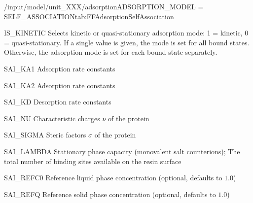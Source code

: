 \begin{condsubgroup}{/input/model/unit\_XXX/adsorption}{ADSORPTION\_MODEL = SELF\_ASSOCIATION}{tab:FFAdsorptionSelfAssociation}
\begin{dataset}[type=int,range={$\{ 0,1 \}$},length={1 / \texttt{NTOTALBND}}]{IS\_KINETIC}
    Selects kinetic or quasi-stationary adsorption mode: 1 = kinetic, 0 = quasi-stationary.
    If a single value is given, the mode is set for all bound states.
    Otherwise, the adsorption mode is set for each bound state separately.
  \end{dataset}
  \begin{dataset}[unit=\si{\raiseto{3}\metre\of{MP}\per\raiseto{3}\metre\of{SP}\per\second}, type=double,range={$\geq 0$},length={\texttt{NCOMP}}]{SAI\_KA1}
    Adsorption rate constants
  \end{dataset}
  \begin{dataset}[unit=\si{\raiseto{6}\metre\of{MP}\per\raiseto{6}\metre\of{SP}\per\second}, type=double,range={$\geq 0$},length={\texttt{NCOMP}}]{SAI\_KA2}
    Adsorption rate constants
  \end{dataset}
  \begin{dataset}[unit=\si{\per\second}, type=double,range={$\geq 0$},length={\texttt{NCOMP}}]{SAI\_KD}
    Desorption rate constants
  \end{dataset}
  \begin{dataset}[type=double,range={$\geq 0$},length={\texttt{NCOMP}}]{SAI\_NU}
    Characteristic charges $\nu$ of the protein
  \end{dataset}
  \begin{dataset}[type=double,range={$\geq 0$},length={\texttt{NCOMP}}]{SAI\_SIGMA}
    Steric factors $\sigma$ of the protein
  \end{dataset}
  \begin{dataset}[unit=\si{\mol\per\cubic\metre\of{SP}}, type=double,range={$\geq 0$},length={1}]{SAI\_LAMBDA}
    Stationary phase capacity (monovalent salt counterions); The total number of binding sites available on the resin surface
  \end{dataset}
  \begin{dataset}[unit=\si{\mol\per\raiseto{3}\metre\of{MP}}, type=double,range={$> 0$},length={1}]{SAI\_REFC0}
    Reference liquid phase concentration (optional, defaults to $1.0$)
  \end{dataset}
  \begin{dataset}[unit=\si{\mol\per\raiseto{3}\metre\of{SP}}, type=double,range={$> 0$},length={1}]{SAI\_REFQ}
    Reference solid phase concentration (optional, defaults to $1.0$) 
  \end{dataset}
\end{condsubgroup}

